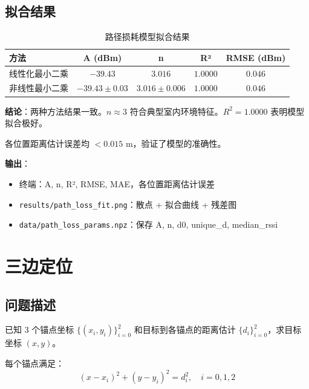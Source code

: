\documentclass[11pt,a4paper]{article}
\newcommand{\code}[1]{\texttt{#1}}
\begin{document}
\subsection{拟合结果}

\begin{table}[H]
\centering
\caption{路径损耗模型拟合结果}
\begin{tabular}{lcccc}
\toprule
\textbf{方法} & \textbf{A (dBm)} & \textbf{n} & \textbf{R²} & \textbf{RMSE (dBm)} \\
\midrule
线性化最小二乘 & $-39.43$ & $3.016$ & $1.0000$ & $0.046$ \\
非线性最小二乘 & $-39.43 \pm 0.03$ & $3.016 \pm 0.006$ & $1.0000$ & $0.046$ \\
\bottomrule
\end{tabular}
\end{table}

\textbf{结论}：两种方法结果一致。$n \approx 3$ 符合典型室内环境特征。$R^2 = 1.0000$ 表明模型拟合极好。

各位置距离估计误差均 $< 0.015$ m，验证了模型的准确性。

\textbf{输出}：
\begin{itemize}
    \item 终端：A, n, R², RMSE, MAE，各位置距离估计误差
    \item \code{results/path\_loss\_fit.png}：散点 + 拟合曲线 + 残差图
    \item \code{data/path\_loss\_params.npz}：保存 A, n, d0, unique\_d, median\_rssi
\end{itemize}

\section{三边定位}

\subsection{问题描述}

已知 3 个锚点坐标 $\{(x_i, y_i)\}_{i=0}^{2}$ 和目标到各锚点的距离估计 $\{d_i\}_{i=0}^{2}$，求目标坐标 $(x, y)$。

每个锚点满足：
\begin{equation}
(x - x_i)^2 + (y - y_i)^2 = d_i^2, \quad i = 0, 1, 2
\end{equation}
\end{document}
